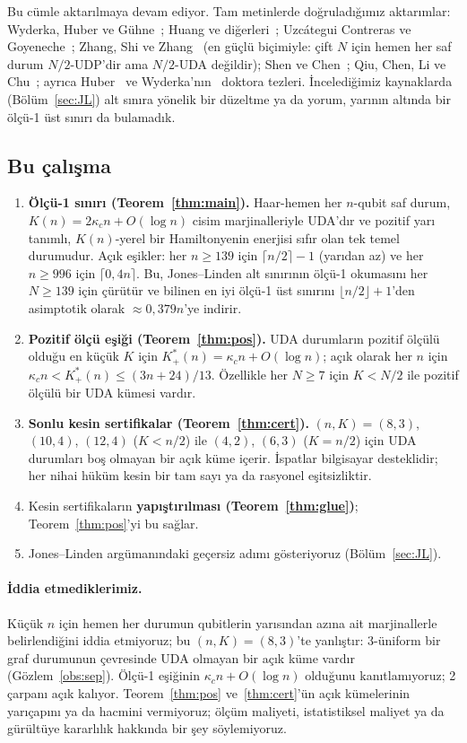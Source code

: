 \documentclass[aps,pra,onecolumn,superscriptaddress,nofootinbib,longbibliography,10pt]{revtex4-2}
\theoremstyle{definition}
\newcommand{\kc}{\kappa_c}
\newcommand{\Kp}{K^{*}_{+}}
\begin{document}
Bu cümle aktarılmaya devam ediyor. Tam metinlerde doğruladığımız aktarımlar: Wyderka, Huber ve Gühne~\cite{WHG17}; Huang ve diğerleri~\cite{HCLZ18}; Uzcátegui Contreras ve Goyeneche~\cite{UG22}; Zhang, Shi ve Zhang~\cite{ZSZ24} (en güçlü biçimiyle: çift $N$ için hemen her saf durum $N/2$-UDP'dir ama $N/2$-UDA değildir); Shen ve Chen~\cite{SC23}; Qiu, Chen, Li ve Chu~\cite{QCLC25}; ayrıca Huber~\cite{Hub17} ve Wyderka'nın~\cite{Wyd20} doktora tezleri. İncelediğimiz kaynaklarda (Bölüm~\ref{sec:JL}) alt sınıra yönelik bir düzeltme ya da yorum, yarının altında bir ölçü-1 üst sınırı da bulamadık.

\subsection*{Bu çalışma}
\begin{enumerate}
\item \textbf{Ölçü-1 sınırı (Teorem~\ref{thm:main}).} Haar-hemen her $n$-qubit saf durum, $K(n)=2\kc n+O(\log n)$ cisim marjinalleriyle UDA'dır ve pozitif yarı tanımlı, $K(n)$-yerel bir Hamiltonyenin enerjisi sıfır olan tek temel durumudur. Açık eşikler: her $n\ge139$ için $\lceil n/2\rceil-1$ (yarıdan az) ve her $n\ge996$ için $\lceil0{,}4n\rceil$. Bu, Jones--Linden alt sınırının ölçü-1 okumasını her $N\ge139$ için çürütür ve bilinen en iyi ölçü-1 üst sınırını $\lfloor n/2\rfloor+1$'den asimptotik olarak $\approx0{,}379n$'ye indirir.
\item \textbf{Pozitif ölçü eşiği (Teorem~\ref{thm:pos}).} UDA durumların pozitif ölçülü olduğu en küçük $K$ için $\Kp(n)=\kc n+O(\log n)$; açık olarak her $n$ için $\kc n<\Kp(n)\le(3n+24)/13$. Özellikle her $N\ge7$ için $K<N/2$ ile pozitif ölçülü bir UDA kümesi vardır.
\item \textbf{Sonlu kesin sertifikalar (Teorem~\ref{thm:cert}).} $(n, K)=(8, 3)$, $(10, 4)$, $(12, 4)$ ($K<n/2$) ile $(4, 2)$, $(6, 3)$ ($K=n/2$) için UDA durumları boş olmayan bir açık küme içerir. İspatlar bilgisayar desteklidir; her nihai hüküm kesin bir tam sayı ya da rasyonel eşitsizliktir.
\item Kesin sertifikaların \textbf{yapıştırılması (Teorem~\ref{thm:glue})}; Teorem~\ref{thm:pos}'yi bu sağlar.
\item Jones--Linden argümanındaki geçersiz adımı gösteriyoruz (Bölüm~\ref{sec:JL}).
\end{enumerate}

\paragraph*{İddia etmediklerimiz.} Küçük $n$ için hemen her durumun qubitlerin yarısından azına ait marjinallerle belirlendiğini iddia etmiyoruz; bu $(n, K)=(8, 3)$'te yanlıştır: 3-üniform bir graf durumunun çevresinde UDA olmayan bir açık küme vardır~\cite{HG16} (Gözlem~\ref{obs:sep}). Ölçü-1 eşiğinin $\kc n+O(\log n)$ olduğunu kanıtlamıyoruz; 2 çarpanı açık kalıyor. Teorem~\ref{thm:pos} ve~\ref{thm:cert}'ün açık kümelerinin yarıçapını ya da hacmini vermiyoruz; ölçüm maliyeti, istatistiksel maliyet ya da gürültüye kararlılık hakkında bir şey söylemiyoruz.
\end{document}

